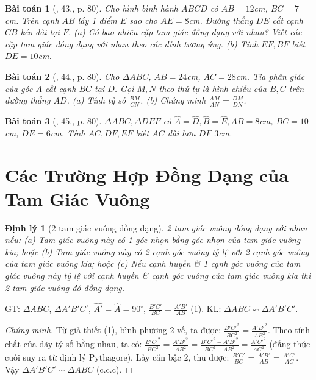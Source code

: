 \documentclass{article}
\newtheorem{baitoan}{Bài toán}
\newtheorem{dinhly}{Định lý}
\begin{document}
\begin{baitoan}[\cite{SGK_Toan_8_tap_2}, 43., p. 80]
	Cho hình bình hành $ABCD$ có $AB = 12$\emph{cm}, $BC = 7$\emph{cm}. Trên cạnh $AB$ lấy 1 điểm $E$ sao cho $AE = 8$\emph{cm}. Đường thẳng $DE$ cắt cạnh $CB$ kéo dài tại $F$. (a) Có bao nhiêu cặp tam giác đồng dạng với nhau? Viết các cặp tam giác đồng dạng với nhau theo các đỉnh tương ứng. (b) Tính $EF,BF$ biết $DE = 10$\emph{cm}.
\end{baitoan}

\begin{baitoan}[\cite{SGK_Toan_8_tap_2}, 44., p. 80]
	Cho $\Delta ABC$, $AB = 24$\emph{cm}, $AC = 28$\emph{cm}. Tia phân giác của góc $A$ cắt cạnh $BC$ tại $D$. Gọi $M,N$ theo thứ tự là hình chiếu của $B,C$ trên đường thẳng $AD$. (a) Tính tỷ số $\frac{BM}{CN}$. (b) Chứng minh $\frac{AM}{AN} = \frac{DM}{DN}$.
\end{baitoan}

\begin{baitoan}[\cite{SGK_Toan_8_tap_2}, 45., p. 80]
	$\Delta ABC,\Delta DEF$ có $\widehat{A} = \widehat{D}, \widehat{B} = \widehat{E}, AB = 8$\emph{cm}, $BC = 10$\emph{cm}, $DE = 6$\emph{cm}. Tính $AC,DF,EF$ biết $AC$ dài hơn $DF$ $3$\emph{cm}.	
\end{baitoan}


\section{Các Trường Hợp Đồng Dạng của Tam Giác Vuông}

\begin{dinhly}[2 tam giác vuông đồng dạng]
	2 tam giác vuông đồng dạng với nhau nếu: (a) Tam giác vuông này có 1 góc nhọn bằng góc nhọn của tam giác vuông kia; hoặc (b) Tam giác vuông này có 2 cạnh góc vuông tỷ lệ với 2 cạnh góc vuông của tam giác vuông kia; hoặc (c) Nếu cạnh huyền \& 1 cạnh góc vuông của tam giác vuông này tỷ lệ với cạnh huyền \& cạnh góc vuông của tam giác vuông kia thì 2 tam giác vuông đó đồng dạng.
\end{dinhly}
GT: $\Delta ABC$, $\Delta A'B'C'$, $\widehat{A'} = \widehat{A} = 90^\circ$, $\frac{B'C'}{BC} = \frac{A'B'}{AB}$ (1). KL: $\Delta ABC\backsim\Delta A'B'C'$.

\begin{proof}[Chứng minh]
	Từ giả thiết (1), bình phương 2 vế, ta được: $\frac{B'C'^2}{BC^2} = \frac{A'B'^2}{AB^2}$. Theo tính chất của dãy tỷ số bằng nhau, ta có: $\frac{B'C'^2}{BC^2} = \frac{A'B'^2}{AB^2} = \frac{B'C'^2 - A'B'^2}{BC^2 - AB^2} = \frac{A'C'^2}{AC^2}$ (đẳng thức cuối suy ra từ định lý Pythagore). Lấy căn bậc 2, thu được: $\frac{B'C'}{BC} = \frac{A'B'}{AB} = \frac{A'C'}{AC}$. Vậy $\Delta A'B'C'\backsim\Delta ABC$ (c.c.c).
\end{proof}
\end{document}
